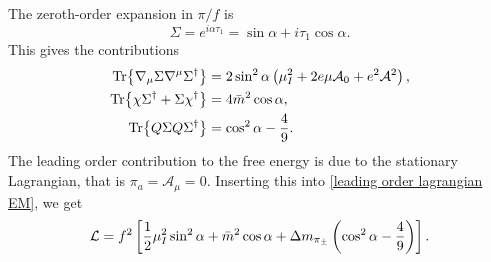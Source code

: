 The zeroth-order expansion in $\pi/f$ is
%
\begin{equation}
    \Sigma = e^{i \alpha \tau_1} = \sin \alpha + i \tau_1 \cos \alpha.
\end{equation}
%
This gives the contributions
%
\begin{align}
    \Tr{\nabla_\mu \Sigma \nabla^\mu \Sigma^\dagger}
    & = 2 \sin^2\alpha\left(\mu_I^2 + 2 e \mu \mathcal A_0 + e^2\mathcal A^2 \right), \\
    \Tr{\chi \Sigma^\dagger + \Sigma \chi^\dagger}
    & =4 \bar m^2 \cos \alpha,\\
    \Tr{Q \Sigma Q \Sigma^\dagger}
    & =  \cos^2 \alpha - \frac{4}{9}.
\end{align}
%
The leading order contribution to the free energy is due to the stationary Lagrangian, that is $\pi_a = \mathcal A_\mu = 0$.
Inserting this into \autoref{leading order lagrangian EM}, we get
%
\begin{equation}
    \label{static lagrangian with EM}
    \mathcal{L} 
    = f^2 \left[
        \frac{1}{2}\mu_I^2 \sin^2 \alpha + \bar m^2 \cos \alpha 
        + \Delta m_{\pi_\pm} \left(\cos^2 \alpha - \frac{4}{9}\right)
    \right].
\end{equation}
%

